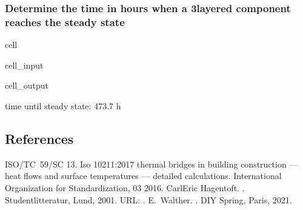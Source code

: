 \documentclass[letterpaper,10pt,english]{jupyterBook}
\begin{document}
\subsubsection{Determine the time in hours when a 3\sphinxhyphen{}layered component reaches the steady state}
\label{\detokenize{Aufgabe1:determine-the-time-in-hours-when-a-3-layered-component-reaches-the-steady-state}}
\begin{sphinxuseclass}{cell}\begin{sphinxVerbatimInput}

\begin{sphinxuseclass}{cell_input}
\begin{sphinxVerbatim}[commandchars=\\\{\}]
    
\end{sphinxVerbatim}

\end{sphinxuseclass}\end{sphinxVerbatimInput}
\begin{sphinxVerbatimOutput}

\begin{sphinxuseclass}{cell_output}
\begin{sphinxVerbatim}[commandchars=\\\{\}]
time until steady state: 473.7 h
\end{sphinxVerbatim}

\end{sphinxuseclass}\end{sphinxVerbatimOutput}

\end{sphinxuseclass}

\subsection{References}
\label{\detokenize{Aufgabe1:references}}
\begin{sphinxthebibliography}{1}
\sphinxAtStartPar
ISO/TC 59/SC 13. Iso 10211:2017 thermal bridges in building construction — heat flows and surface temperatures — detailed calculations. International Organization for Standardization, 03 2016.
\sphinxAtStartPar
Carl\sphinxhyphen{}Eric Hagentoft. . Studentlitteratur, Lund, 2001. URL: .
\sphinxAtStartPar
E. Walther. . DIY Spring, Paris, 2021.
\end{sphinxthebibliography}







\renewcommand{\indexname}{Index}
\printindex
\end{document}
